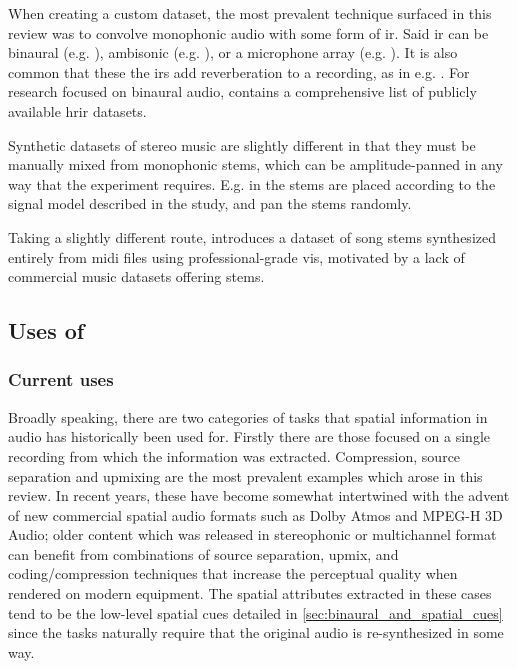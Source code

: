 \documentclass[referee,pdflatex,sn-mathphys-num]{sn-jnl}%
\begin{document}
When creating a custom dataset, the most prevalent technique surfaced in this review was to convolve monophonic audio with some form of \gls{ir}. Said \gls{ir} can be binaural (e.g. \cite{nastasiPsychoAcousticalExperimentUsing2020}), ambisonic (e.g. \cite{lluisDirectionSpecificAmbisonics2023}), or a microphone array (e.g. \cite{coteliSphericalHarmonicsBased2021}). It is also common that these the \glspl{ir} add reverberation to a recording, as in e.g. \cite{uhleSubbandCenterScaling2014,coteliMultipleSoundSource2019,tylerPredictingBinauralRoom2023,gerkenComparison2D3D2024}. For research focused on binaural audio, \cite{zielinskiAutomaticDiscriminationFront2022} contains a comprehensive list of publicly available \gls{hrir} datasets.

Synthetic datasets of stereo music are slightly different in that they must be manually mixed from monophonic stems, which can be amplitude-panned in any way that the experiment requires. E.g. in \cite{harmaStereoAudioClassification2011} the stems are placed according to the signal model described in the study, and \cite{petermannSpainNetSpatiallyInformedStereophonic2022,yangUpmixingStyleTransfer2022} pan the stems randomly.

Taking a slightly different route, \cite{manilowCuttingMusicSource2019} introduces a dataset of song stems synthesized entirely from \gls{midi} files using professional-grade \glspl{vi}, motivated by a lack of commercial music datasets offering stems.


\subsection{Uses of }
\label{sec:uses_of_sips}

\subsubsection{Current uses}
\label{sec:current_uses_of_sips}

Broadly speaking, there are two categories of tasks that spatial information in audio has historically been used for. Firstly there are those focused on a single recording from which the information was extracted. Compression, source separation and upmixing are the most prevalent examples which arose in this review. In recent years, these have become somewhat intertwined with the advent of new commercial spatial audio formats such as Dolby Atmos and MPEG-H 3D Audio; older content which was released in stereophonic or multichannel format can benefit from combinations of source separation, upmix, and coding/compression techniques that increase the perceptual quality when rendered on modern equipment. The spatial attributes extracted in these cases tend to be the low-level spatial cues detailed in \cref{sec:binaural_and_spatial_cues} since the tasks naturally require that the original audio is re-synthesized in some way.
\end{document}
